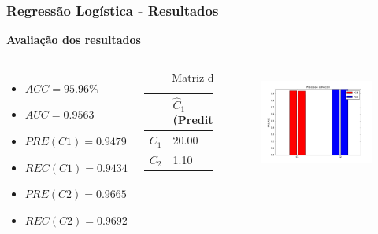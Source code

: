 \documentclass{beamer}
\begin{document}
\begin{frame}
\frametitle{Regressão Logística - Resultados}

\textbf{Avaliação dos resultados}
\begin{columns}[c] 
\begin{itemize}
\item $ACC = 95.96 \%$
\item $AUC = 0.9563 $
\item $PRE(C1) = 0.9479$
\item $REC(C1) = 0.9434$
\item $PRE(C2) = 0.9665$
\item $REC(C2) = 0.9692$
\end{itemize}

\begin{table}
\begin{tabular}{l l l}
\toprule
 & \textbf{$\hat{C}_1$ (Predita)} & \textbf{$\hat{C}_2$(Predita)}\\
\midrule
$C_1$ & 20.00&1.20\\ 
$C_2$ & 1.10&34.60\\ 
\bottomrule
\end{tabular}
\caption{Matriz de confusão}
\end{table}


\begin{figure}[H]
\centering
  \includegraphics[width=\linewidth]{../img/log_reg_rec.png}
  \label{fig:percep}
\end{figure}%

\end{columns}

\end{frame}
\end{document}
